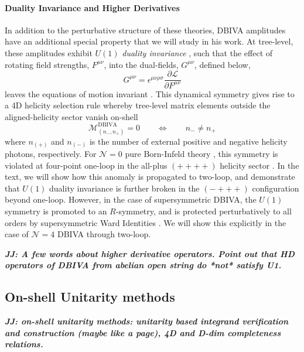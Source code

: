 \documentclass[12pt,letter]{article}
\def\be{\begin{equation}}
\def\ee{\end{equation}}
\def\dj#1{{\color{NUpurple}\it \bf JJ: #1}}
\begin{document}
\paragraph{Duality Invariance and Higher Derivatives}
In addition to the perturbative structure of these theories, DBIVA amplitudes have an additional special property that we will study in his work. At tree-level, these amplitudes exhibit $U(1)$ \textit{duality invariance} \cite{Bossard:2012xs,Novotny:2018iph}, such that the effect of rotating field strengths, $F^{\mu\nu}$, into the dual-fields, $G^{\mu\nu}$, defined below,
\be
G^{\mu\nu} = \epsilon^{\mu\nu\rho\sigma}\frac{\partial \mathcal{L}}{\partial F^{\mu\nu}}
\ee
leaves the equations of motion invariant \cite{Gibbons:1995ap,Babaei-Aghbolagh:2013hia}. This dynamical symmetry gives rise to a 4D helicity selection rule \cite{Novotny:2018iph} whereby tree-level matrix elements outside the aligned-helicity sector vanish on-shell
\be
\mathcal{M}^{\text{DBIVA}}_{(n_{-}, n_{+})} =0 \qquad \Leftrightarrow \qquad n_{-}\neq n_{+}
\ee
where $n_{(+)}$ and $n_{(-)}$ is the number of external positive and negative helicity photons, respectively. For $\mathcal{N}=0$ pure Born-Infeld theory \cite{Born:1934gh,Schrodinger:1935oqa}, this symmetry is violated at four-point one-loop in the all-plus $(++++)$ helicity sector \cite{Elvang:2019twd}. In the text, we will show how this anomaly is propagated to two-loop, and demonstrate that $U(1)$ duality invariance is further broken in the $(-+++)$ configuration beyond one-loop. However, in the case of supersymmetric DBIVA, the $U(1)$ symmetry is promoted to an $R$-symmetry, and is protected perturbatively to all orders by supersymmetric Ward Identities \cite{Heydeman:2017yww}. We will show this explicitly in the case of $\mathcal{N}=4$ DBIVA through two-loop. 

\dj{A few words about higher derivative operators.  Point out that HD operators of DBIVA from abelian open string do *not* satisfy U1.}


\subsection{On-shell Unitarity methods }\label{sec:genU}
\dj{on-shell unitarity methods: unitarity based integrand verification and construction (maybe like a page), 4D and D-dim completeness relations. }
\end{document}
